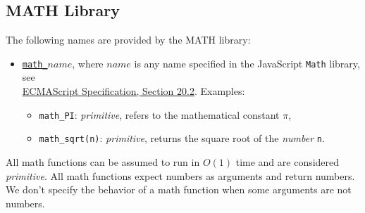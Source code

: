 \subsection*{MATH Library}


The following names are provided by the MATH library:
\begin{itemize}
\item \href{https://sourceacademy.org/sicpjs/1.1.4\#p8}{\lstinline{math_}$\textit{name}$},
where $\textit{name}$ is any name specified in the
JavaScript
\texttt{Math} library, see\\
\href{https://www.ecma-international.org/ecma-262/9.0/index.html\#sec-math-object}{\color{DarkBlue}ECMAScript Specification, Section 20.2}. Examples:
\begin{itemize}
\item \verb#math_PI#: \textit{primitive}, refers to the mathematical constant $\pi$,
\item \verb#math_sqrt#\texttt{(n)}: \textit{primitive}, returns the square root of the \emph{number} \texttt{n}.
\end{itemize}
\end{itemize}
All math functions can be assumed to run in $O(1)$ time and are considered
\textit{primitive}. All math functions expect numbers as arguments and return numbers.
We don't specify the behavior of a math function when some arguments are
not numbers.
